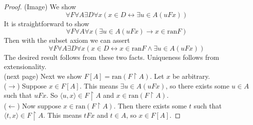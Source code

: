 \documentclass{report}
\begin{document}
\begin{proof}(Image)
We show 
\begin{equation*}
\forall F\forall A\exists D\forall x(x\in D\leftrightarrow\exists u\in A(uFx))
\end{equation*}
It is straightforward to show
\begin{equation*}
\forall F\forall A\forall x(\exists u\in A(uFx)\to x\in\text{ran}F)
\end{equation*}
Then with the subset axiom we can assert
\begin{equation*}
\forall F\forall A\exists D\forall x(x\in D\leftrightarrow x\in\text{ran}F\land\exists u\in A(uFx))
\end{equation*}
The desired result follows from these two facts. Uniqueness follows from extensionality.\\
(next page)\newpage
Next we show $F[A]=\text{ran}(F\restriction A)$. Let $x$ be arbitrary.\\
\indent($\rightarrow$) Suppose $x\in F[A]$. This means $\exists u\in A(uFx)$, so there exists some $u\in A$ such that $uFx$. So $\langle u,x\rangle\in F\restriction A$ and 
$x\in\text{ran}(F\restriction A)$.\\
\indent($\leftarrow$) Now suppose $x\in\text{ran}(F\restriction A)$. Then there exists some $t$ such that $\langle t,x\rangle\in F\restriction A$. This means 
$tFx$ and $t\in A$, so $x\in F[A]$.
\end{proof}
\end{document}
